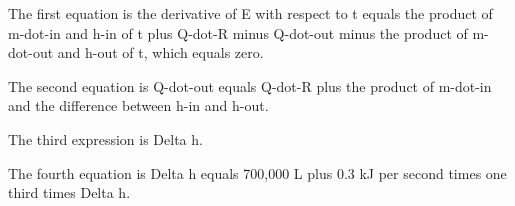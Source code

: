 The first equation is the derivative of E with respect to t equals the product of m-dot-in and h-in of t plus Q-dot-R minus Q-dot-out minus the product of m-dot-out and h-out of t, which equals zero.

The second equation is Q-dot-out equals Q-dot-R plus the product of m-dot-in and the difference between h-in and h-out.

The third expression is Delta h.

The fourth equation is Delta h equals 700,000 L plus 0.3 kJ per second times one third times Delta h.